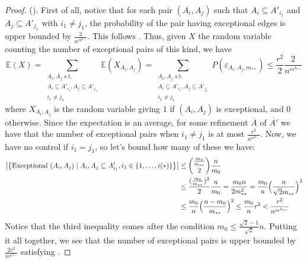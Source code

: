 \begin{lemma}[Claim 4.14]
\begin{proof}
            ().
            First of all, notice that for each pair $(A_i, A_j)$ such that $A_i \subseteq A'_{i_1}$ and
            $A_j \subseteq A'_{j_1}$ with $i_1 \neq j_1$, the probability of the pair having exceptional edges is
            upper bounded by $\frac{2}{n^{c\epsilon^{k_{**}}}}$.
            This follows .
            Thus, given $X$ the random variable counting the number of exceptional pairs of this kind, we have
            \[
                \mathbb{E}(X) = \sum_{\substack{A_i,A_j \text{ s.t.}\\A_i\subseteq A'_{i_1},A_j\subseteq A'_{j_1}\\i_1\neq j_1}} \mathbb{E}(X_{A_i, A_j})
                     = \sum_{\substack{A_i,A_j \text{ s.t.}\\A_i\subseteq A'_{i_1},A_j\subseteq A'_{j_1}\\i_1\neq j_1}} P(\varepsilon_{A_i, A_j,m_{**}})
                     \leq \frac{r^2}{2} \frac{2}{n^{c\epsilon^{k_{**}}}}
            \]
            where $X_{A_i,A_j}$ is the random variable giving $1$ if $(A_i, A_j)$ is exceptional, and $0$ otherwise.
            Since the expectation is an average, for some refinement $\overline{A}$ of $\overline{A'}$ we have that
            the number of exceptional pairs when $i_1 \neq j_1$ is at most $\frac{r^2}{n^{c\epsilon^{k_{**}}}}$.
            Now, we have no control if $i_1 = j_1$, so let's bound how many of these we have:
            \[
                \begin{split}
                    \bigl| \bigl\{ \text{Exceptional } (A_i, A_j) \mid A_i, A_j \subseteq A'_{i_1}, i_1 \in \{ 1, \dots, i(*) \} \bigr\} \bigr|
                        & \leq {\frac{m_0}{m_{**}} \choose 2} \frac{n}{m_0} \\
                        & \leq \frac{( \frac{m_0}{m_{**}} )^2}{2} \frac{n}{m_0}
                            = \frac{m_0 n}{2 m_{**}^2}
                            = \frac{m_0}{n} \Bigl( \frac{n}{\sqrt{2}m_{**}} \Bigr)^2 \\
                        & \leq \frac{m_0}{n} \Bigl( \frac{n - m_0}{m_{**}} \Bigr)^2
                            \leq \frac{m_0}{n} r^2
                            < \frac{r^2}{n^{c \epsilon^{k_{**}}}}
                \end{split}
            \]
            Notice that the third inequality comes after the condition $m_0 \leq \frac{\sqrt{2}-1}{\sqrt{2}} n$.
            Putting it all together, we see that the number of exceptional pairs is upper bounded by
                $\frac{2r^2}{n^{c\epsilon^{k_{**}}}}$ satisfying .
        \end{proof}
    \end{lemma}

